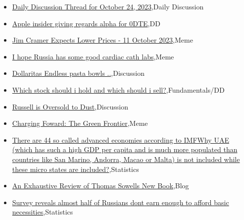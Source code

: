\documentclass{article}%
\begin{document}
%
\begin{itemize}%
\item%
\href{https://reddit.com/r/wallstreetbets/comments/17f95se/daily\_discussion\_thread\_for\_october\_24\_2023/}{Daily Discussion Thread for October 24, 2023},Daily Discussion%
\item%
\href{https://reddit.com/r/wallstreetbets/comments/17f4k4h/apple\_insider\_giving\_regards\_alpha\_for\_0dte/}{Apple insider giving regards alpha for 0DTE},DD%
\item%
\href{https://reddit.com/r/wallstreetbets/comments/17f46p6/jim\_cramer\_expects\_lower\_prices\_11\_october\_2023/}{Jim Cramer Expects Lower Prices - 11 October 2023},Meme%
\item%
\href{https://reddit.com/r/wallstreetbets/comments/17f3ndy/i\_hope\_russia\_has\_some\_good\_cardiac\_cath\_labs/}{I hope Russia has some good cardiac cath labs},Meme%
\item%
\href{https://reddit.com/r/wallstreetbets/comments/17f21vf/dollaritas\_endless\_pasta\_bowls/}{Dollaritas  Endless pasta bowls ..},Discussion%
\item%
\href{https://reddit.com/r/StockMarket/comments/17f68ic/which\_stock\_should\_i\_hold\_and\_which\_should\_i\_sell/}{Which stock should i hold and which should i sell?},Fundamentals/DD%
\item%
\href{https://reddit.com/r/StockMarket/comments/17etzlm/russell\_is\_oversold\_to\_dust/}{Russell is Oversold to Dust},Discussion%
\item%
\href{https://reddit.com/r/StockMarket/comments/17e9p4b/charging\_foward\_the\_green\_frontier/}{Charging Foward: The Green Frontier},Meme%
\item%
\href{https://reddit.com/r/Economics/comments/17f3kt5/there\_are\_44\_so\_called\_advanced\_economies/}{There are 44 so called advanced economies according to IMFWhy UAE (which has such a high GDP per capita and is much more populated than countries like San Marino, Andorra, Macao or Malta) is not included while these micro states are included?},Statistics%
\item%
\href{https://reddit.com/r/Economics/comments/17eylh9/an\_exhaustive\_review\_of\_thomas\_sowells\_new\_book/}{An Exhaustive Review of Thomas Sowells New Book},Blog%
\item%
\href{https://reddit.com/r/Economics/comments/17evgvs/survey\_reveals\_almost\_half\_of\_russians\_dont\_earn/}{Survey reveals almost half of Russians dont earn enough to afford basic necessities},Statistics%
\end{itemize}%
\end{document}
